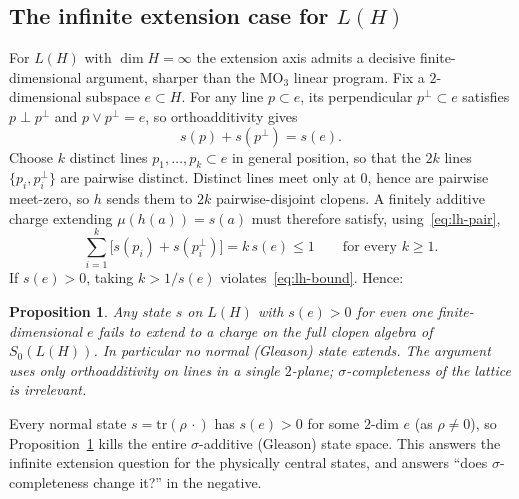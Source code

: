 \documentclass[11pt]{article}
\newtheorem{proposition}[theorem]{Proposition}
\theoremstyle{definition}
\newcommand{\tr}{\mathrm{tr}}
\begin{document}
\subsection{The infinite extension case for $L(H)$}
\label{sec:lh}

For $L(H)$ with $\dim H = \infty$ the extension axis admits a decisive
finite-dimensional argument, sharper than the $\mathrm{MO}_3$ linear
program.  Fix a $2$-dimensional subspace $e \subset H$.  For any line
$p \subset e$, its perpendicular $p^\perp \subset e$ satisfies
$p \perp p^\perp$ and $p \vee p^\perp = e$, so orthoadditivity gives
\begin{equation}\label{eq:lh-pair}
  s(p) + s(p^\perp) = s(e).
\end{equation}
Choose $k$ distinct lines $p_1, \dots, p_k \subset e$ in general
position, so that the $2k$ lines $\{p_i, p_i^\perp\}$ are pairwise
distinct.  Distinct lines meet only at $0$, hence are pairwise
meet-zero, so $h$ sends them to $2k$ pairwise-disjoint clopens.  A
finitely additive charge extending $\mu(h(a)) = s(a)$ must therefore
satisfy, using~\eqref{eq:lh-pair},
\begin{equation}\label{eq:lh-bound}
  \sum_{i=1}^{k} \bigl[s(p_i) + s(p_i^\perp)\bigr] = k\, s(e) \leq 1
  \qquad\text{for every } k \geq 1.
\end{equation}
If $s(e) > 0$, taking $k > 1/s(e)$ violates~\eqref{eq:lh-bound}.  Hence:

\begin{proposition}\label{prop:lh}
Any state $s$ on $L(H)$ with $s(e) > 0$ for even one finite-dimensional
$e$ fails to extend to a charge on the full clopen algebra of
$S_0(L(H))$.  In particular no normal (Gleason) state extends.  The
argument uses only orthoadditivity on lines in a single $2$-plane;
$\sigma$-completeness of the lattice is irrelevant.
\end{proposition}

Every normal state $s = \tr(\rho\,\cdot)$ has $s(e) > 0$ for some $2$-dim
$e$ (as $\rho \neq 0$), so Proposition~\ref{prop:lh} kills the entire
$\sigma$-additive (Gleason) state space.  This answers the infinite
extension question for the physically central states, and answers
``does $\sigma$-completeness change it?'' in the negative.
\end{document}
